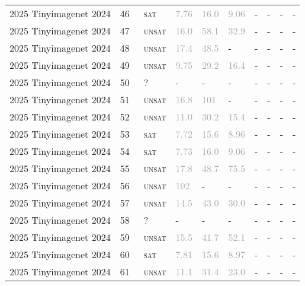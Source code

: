 \begin{center}
{\begin{longtable}{@{}llllllllll@{}}
2025 Tinyimagenet 2024 & 46 & ~\textsc{sat} & \textcolor{darkgray}{7.76} & \textcolor{darkgray}{16.0} & \textcolor{darkgray}{9.06} & - & - & - & - \\
2025 Tinyimagenet 2024 & 47 & ~\textsc{unsat} & \textcolor{darkgray}{16.0} & \textcolor{darkgray}{58.1} & \textcolor{darkgray}{32.9} & - & - & - & - \\
2025 Tinyimagenet 2024 & 48 & ~\textsc{unsat} & \textcolor{darkgray}{17.4} & \textcolor{darkgray}{48.5} & - & - & - & - & - \\
2025 Tinyimagenet 2024 & 49 & ~\textsc{unsat} & \textcolor{darkgray}{9.75} & \textcolor{darkgray}{29.2} & \textcolor{darkgray}{16.4} & - & - & - & - \\
2025 Tinyimagenet 2024 & 50 & ~? & - & - & - & - & - & - & - \\
2025 Tinyimagenet 2024 & 51 & ~\textsc{unsat} & \textcolor{darkgray}{16.8} & \textcolor{darkgray}{101} & - & - & - & - & - \\
2025 Tinyimagenet 2024 & 52 & ~\textsc{unsat} & \textcolor{darkgray}{11.0} & \textcolor{darkgray}{30.2} & \textcolor{darkgray}{15.4} & - & - & - & - \\
2025 Tinyimagenet 2024 & 53 & ~\textsc{sat} & \textcolor{darkgray}{7.72} & \textcolor{darkgray}{15.6} & \textcolor{darkgray}{8.96} & - & - & - & - \\
2025 Tinyimagenet 2024 & 54 & ~\textsc{sat} & \textcolor{darkgray}{7.73} & \textcolor{darkgray}{16.0} & \textcolor{darkgray}{9.06} & - & - & - & - \\
2025 Tinyimagenet 2024 & 55 & ~\textsc{unsat} & \textcolor{darkgray}{17.8} & \textcolor{darkgray}{48.7} & \textcolor{darkgray}{75.5} & - & - & - & - \\
2025 Tinyimagenet 2024 & 56 & ~\textsc{unsat} & \textcolor{darkgray}{102} & - & - & - & - & - & - \\
2025 Tinyimagenet 2024 & 57 & ~\textsc{unsat} & \textcolor{darkgray}{14.5} & \textcolor{darkgray}{43.0} & \textcolor{darkgray}{30.0} & - & - & - & - \\
2025 Tinyimagenet 2024 & 58 & ~? & - & - & - & - & - & - & - \\
2025 Tinyimagenet 2024 & 59 & ~\textsc{unsat} & \textcolor{darkgray}{15.5} & \textcolor{darkgray}{41.7} & \textcolor{darkgray}{52.1} & - & - & - & - \\
2025 Tinyimagenet 2024 & 60 & ~\textsc{sat} & \textcolor{darkgray}{7.81} & \textcolor{darkgray}{15.6} & \textcolor{darkgray}{8.97} & - & - & - & - \\
2025 Tinyimagenet 2024 & 61 & ~\textsc{unsat} & \textcolor{darkgray}{11.1} & \textcolor{darkgray}{31.4} & \textcolor{darkgray}{23.0} & - & - & - & - \\

\end{longtable}}
\end{center}
